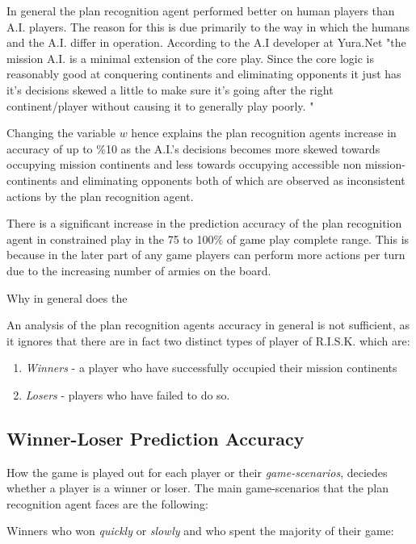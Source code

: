\documentclass[parskip]{cs4rep}
\begin{document}
In general the plan recognition agent performed better on human players than A.I. players. The reason for this is due primarily to the way in which the humans and the A.I. differ in operation. According to the A.I developer at Yura.Net "the mission A.I. is a minimal extension of the core play. Since the core logic is reasonably good at conquering continents and eliminating opponents it just has it's decisions skewed a little to make sure it's going after the right continent/player without causing it to generally play poorly. "

Changing the variable $w$ hence explains the plan recognition agents increase in accuracy of up to \%10  as the A.I.'s decisions becomes more skewed towards occupying mission continents and less towards occupying accessible non mission-continents and eliminating opponents both of which are observed as inconsistent actions by the plan recognition agent.

There is a significant increase in the prediction accuracy of the plan recognition agent in constrained play in the 75 to 100\% of game play complete range. This is because in the later part of any game players can perform more actions per turn due to the increasing number of armies on the board.

Why in general does the 



An analysis of the plan recognition agents accuracy in general is not sufficient, as it ignores that there are in fact two distinct types of player of R.I.S.K. which are:

\begin{enumerate}
\item
\textit{Winners} - a player who have successfully occupied their mission continents
\item
\textit{Losers} - players who have failed to do so.
\end{enumerate}

\subsection{Winner-Loser Prediction Accuracy}

How the game is played out for each player or their \textit{game-scenarios}, deciedes whether a player is a winner or loser.  The main game-scenarios that the plan recognition agent faces are the following:

Winners who won \textit{quickly} or \textit{slowly} and who spent the majority of their game:
\end{document}
